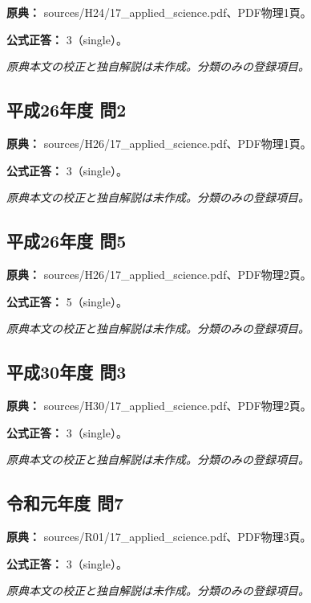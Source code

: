 \noindent\textbf{原典：} sources/H24/17\_applied\_science.pdf、PDF物理1頁。

\textbf{公式正答：} 3（single）。

\par\textit{原典本文の校正と独自解説は未作成。分類のみの登録項目。}

\subsection{平成26年度 問2}
\label{q:h26-reg-applied-02}

\noindent\textbf{原典：} sources/H26/17\_applied\_science.pdf、PDF物理1頁。

\textbf{公式正答：} 3（single）。

\par\textit{原典本文の校正と独自解説は未作成。分類のみの登録項目。}

\subsection{平成26年度 問5}
\label{q:h26-reg-applied-05}

\noindent\textbf{原典：} sources/H26/17\_applied\_science.pdf、PDF物理2頁。

\textbf{公式正答：} 5（single）。

\par\textit{原典本文の校正と独自解説は未作成。分類のみの登録項目。}

\subsection{平成30年度 問3}
\label{q:h30-reg-applied-03}

\noindent\textbf{原典：} sources/H30/17\_applied\_science.pdf、PDF物理2頁。

\textbf{公式正答：} 3（single）。

\par\textit{原典本文の校正と独自解説は未作成。分類のみの登録項目。}

\subsection{令和元年度 問7}
\label{q:r01-reg-applied-07}

\noindent\textbf{原典：} sources/R01/17\_applied\_science.pdf、PDF物理3頁。

\textbf{公式正答：} 3（single）。

\par\textit{原典本文の校正と独自解説は未作成。分類のみの登録項目。}

